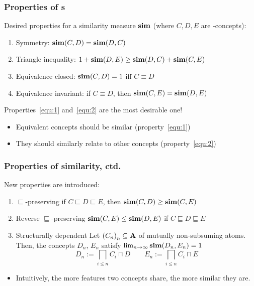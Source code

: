 \documentclass[smaller]{beamer}
\newcounter{simprop}
\newcommand{\propstop}{\setcounter{simprop}{\theenumi}}
\newcommand{\propplay}{\setcounter{enumi}{\thesimprop}}
\begin{document}
\begin{frame}
  \frametitle{Properties of \csm{}s}
  Desired properties for a 
  \alert{similarity measure} \(\operatorname{\mathbf{sim}}\) (where \(C,D,E\) are \elh-concepts):
  \begin{enumerate}[<+->]
    \item \alert{Symmetry}: \(\operatorname{\mathbf{sim}}(C,D) = \operatorname{\mathbf{sim}}(D,C)\)
    \item \alert{Triangle inequality}:
      \(1 + \operatorname{\mathbf{sim}}(D,E) \ge \operatorname{\mathbf{sim}}(D,C) + \operatorname{\mathbf{sim}}(C,E)\)
    \item\label{equ:1} \alert{Equivalence closed}:
      \(\operatorname{\mathbf{sim}}(C,D) = 1\) iff \(C \equiv D\)
    \item\label{equ:2} \alert{Equivalence invariant}:
      if \(C \equiv D\), then
      \(\operatorname{\mathbf{sim}}(C,E) = \operatorname{\mathbf{sim}}(D,E)\)
    \propstop
  \end{enumerate}
  Properties~\ref{equ:1} and~\ref{equ:2} are the most desirable one!
  \begin{itemize}
    \item Equivalent concepts should be similar (property~\ref{equ:1})
    \item They should similarly relate to other concepts (property~\ref{equ:2})
  \end{itemize}
\end{frame}

\begin{frame}
  \frametitle{Properties of similarity, ctd.}
  New properties are introduced:
  \begin{enumerate}[<+->]
    \propplay
    \item \(\sqsubseteq\)-preserving if \(C \sqsubseteq D \sqsubseteq E\),
    then \(\operatorname{\mathbf{sim}}(C,D) \ge \operatorname{\mathbf{sim}}(C,E)\)
    \item Reverse \(\sqsubseteq\)-preserving 
    \(\operatorname{\mathbf{sim}}(C,E) \le \operatorname{\mathbf{sim}}(D,E)\) if
    \(C \sqsubseteq D \sqsubseteq E\)
    \item Structurally dependent
    Let \({(C_n)}_n \subseteq \mathbf{A}\) of mutually
    non-subsuming atoms. Then, the concepts
    \(D_n\), \(E_n\) satisfy
    \(\lim_{n \to \infty} \operatorname{\mathbf{sim}}(D_n,E_n) = 1\)
    \begin{equation*}
      D_n := \bigsqcap_{i \le n} C_i \sqcap D \qquad
      E_n := \bigsqcap_{i \le n} C_i \sqcap E
    \end{equation*}
  \end{enumerate}
  \begin{itemize}[<+->]
    \item Intuitively, the more \alert{features}
    two concepts share, the more similar they are.
  \end{itemize}
\end{frame}
\end{document}
